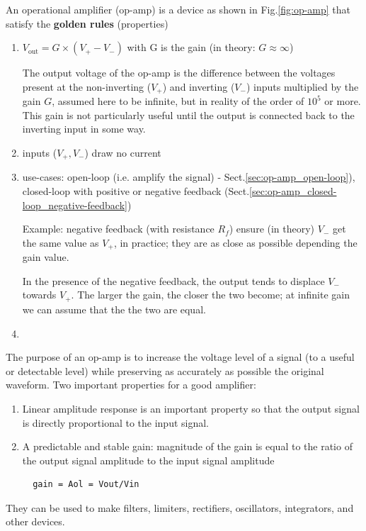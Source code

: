 An operational amplifier (op-amp) is a device as shown in Fig.\ref{fig:op-amp}
that satisfy the {\bf golden rules} (properties)
\begin{enumerate}
  \item $V_\text{out} = G \times (V_+ - V_-)$ with G is the
  gain (in theory: $G \approx \infty$)

The output voltage of the op-amp is the difference between the voltages present
at the non-inverting ($V_+$) and inverting ($V_-$) inputs multiplied by the gain
$G$, assumed here to be infinite, but in reality of the order of $10^5$ or more.
This gain is not particularly useful until the output is connected back to the
inverting input in some way.

  \item inputs ($V_+, V_-$) draw no current

  \item use-cases: open-loop (i.e. amplify the signal) -
  Sect.\ref{sec:op-amp_open-loop}), closed-loop with positive or negative
  feedback (Sect.\ref{sec:op-amp_closed-loop_negative-feedback})

  Example: negative feedback (with resistance $R_f$) ensure (in theory) $V_-$
  get the same value as $V_+$, in practice; they are as close as possible
  depending the gain value.

  In the presence of the negative feedback, the output tends to displace $V_-$
  towards $V_+$.
  The larger the gain, the closer the two become; at infinite gain we can assume
  that the the two are equal.

  \item

\end{enumerate}

The purpose of an op-amp is to increase the voltage
level of a signal (to a useful or detectable level) while preserving as
accurately as possible the original waveform. Two important properties for a
good amplifier:
\begin{enumerate}
  \item  Linear amplitude response is an
important property so that the output signal is directly proportional to the input signal.
  \item A predictable and stable gain: magnitude of the gain is equal to the ratio of the output
signal amplitude to the input signal amplitude
  \begin{verbatim}
  gain = Aol = Vout/Vin
  \end{verbatim}

\end{enumerate}
They can be used to make filters, limiters,  rectifiers, oscillators,
integrators, and other devices.


